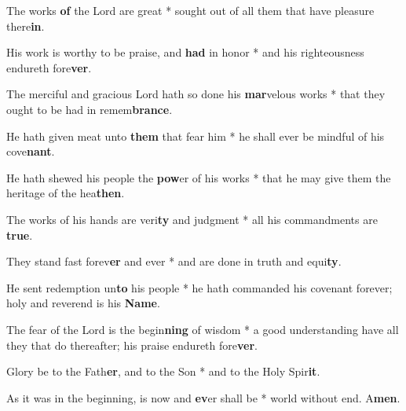 \begin{multicols}{2}
	The works \textbf{of} the Lord are great * sought out of all them that have pleasure there\textbf{in}.
	
	His work is worthy to be praise, and \textbf{had} in honor * and his righteousness endureth fore\textbf{ver}.
	
	The merciful and gracious Lord hath so done his \textbf{mar}velous works * that they ought to be had in remem\textbf{brance}.
	
	He hath given meat unto \textbf{them} that fear him * he shall ever be mindful of his cove\textbf{nant}.
	
	He hath shewed his people the \textbf{pow}er of his works * that he may give them the heritage of the hea\textbf{then}.
	
	The works of his hands are veri\textbf{ty} and judgment * all his commandments are \textbf{true}.
	
	They stand fast forev\textbf{er} and ever * and are done in truth and equi\textbf{ty}.
	
	He sent redemption un\textbf{to} his people * he hath commanded his covenant forever; holy and reverend is his \textbf{Name}.
	
	The fear of the Lord is the begin\textbf{ning} of wisdom * a good understanding have all they that do thereafter; his praise endureth fore\textbf{ver}.
	
	Glory be to the Fath\textbf{er}, and to the Son * and to the Holy Spir\textbf{it}.
	
	As it was in the beginning, is now and \textbf{ev}er shall be * world without end. A\textbf{men}.
\end{multicols}